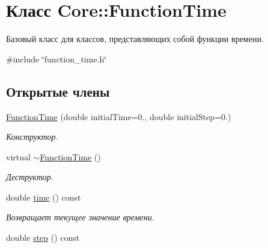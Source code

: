\hypertarget{class_core_1_1_function_time}{}\section{Класс Core\+:\+:Function\+Time}
\label{class_core_1_1_function_time}


Базовый класс для классов, представляющих собой функции времени.  




{\ttfamily \#include \char`\"{}function\+\_\+time.\+h\char`\"{}}

\subsection*{Открытые члены}
\begin{DoxyCompactItemize}
\item 
\hyperlink{class_core_1_1_function_time_a7d2987678c02b38563cd21261884d679}{Function\+Time} (double initial\+Time=0., double initial\+Step=0.)\hypertarget{class_core_1_1_function_time_a7d2987678c02b38563cd21261884d679}{}\label{class_core_1_1_function_time_a7d2987678c02b38563cd21261884d679}

\begin{DoxyCompactList}\small\item\em Конструктор. \end{DoxyCompactList}\item 
virtual \hyperlink{class_core_1_1_function_time_a35d2db55f45326b660b9831c6e9ac5c6}{$\sim$\+Function\+Time} ()\hypertarget{class_core_1_1_function_time_a35d2db55f45326b660b9831c6e9ac5c6}{}\label{class_core_1_1_function_time_a35d2db55f45326b660b9831c6e9ac5c6}

\begin{DoxyCompactList}\small\item\em Деструктор. \end{DoxyCompactList}\item 
double \hyperlink{class_core_1_1_function_time_abaedf877206f34b75990c2487fdffb2e}{time} () const \hypertarget{class_core_1_1_function_time_abaedf877206f34b75990c2487fdffb2e}{}\label{class_core_1_1_function_time_abaedf877206f34b75990c2487fdffb2e}

\begin{DoxyCompactList}\small\item\em Возвращает текущее значение времени. \end{DoxyCompactList}\item 
double \hyperlink{class_core_1_1_function_time_afd6e77dd05e9f0d6377a29084ce41b75}{step} () const \hypertarget{class_core_1_1_function_time_afd6e77dd05e9f0d6377a29084ce41b75}{}\label{class_core_1_1_function_time_afd6e77dd05e9f0d6377a29084ce41b75}


\end{DoxyCompactItemize}

